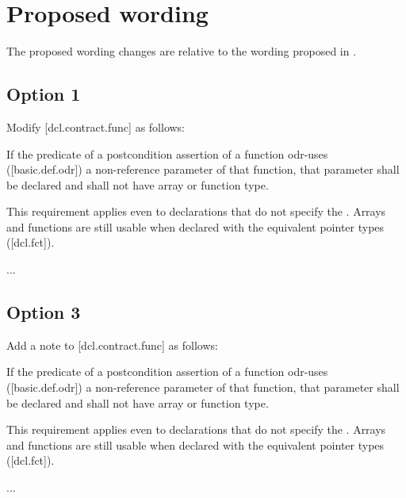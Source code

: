 \pagebreak %

\section{Proposed wording}

The proposed wording changes are relative to the wording proposed in \cite{P2900R10}.

\subsection*{Option 1}

Modify [dcl.contract.func] as follows:

\begin{adjustwidth}{0.5cm}{0.5cm}
If the predicate of a postcondition assertion of a function odr-uses ([basic.def.odr]) a
non-reference parameter of that function, that parameter shall be declared  and shall not have array or function type.
\begin{note}
This requirement applies even to declarations
that do not specify the . Arrays and functions are still usable when declared with the equivalent pointer types ([dcl.fct]).
\end{note}
\begin{example}
...
\end{example}
\end{adjustwidth}


\subsection*{Option 3}

Add a note to [dcl.contract.func] as follows:

\begin{adjustwidth}{0.5cm}{0.5cm}
If the predicate of a postcondition assertion of a function odr-uses ([basic.def.odr]) a
non-reference parameter of that function, that parameter shall be declared  and
shall not have array or function type.
\begin{note}
This requirement applies even to declarations
that do not specify the . Arrays and functions are still usable when declared with the equivalent pointer types ([dcl.fct]).
\end{note}
\begin{example}
...
\end{example}
\end{adjustwidth}



